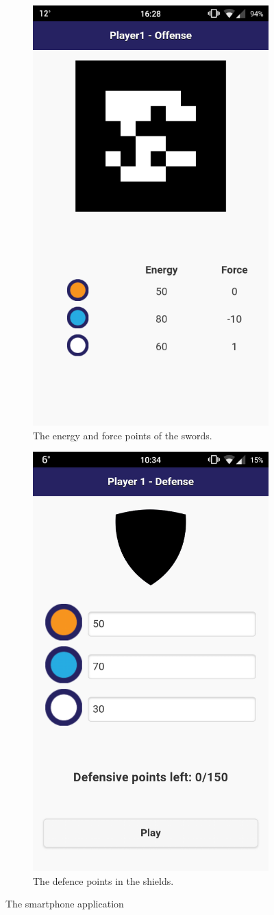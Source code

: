 \begin{figure}[ht!]
  \begin{subfigure}[t]{0.48\linewidth}
    \centering
    \includegraphics[width=0.60\linewidth]{images/c5/points.png} 
    \caption{The energy and force points of the swords.}\label{fig:5a}
  \end{subfigure}\hfill
  \begin{subfigure}[t]{0.48\linewidth}
    \centering
    \includegraphics[width=0.60\linewidth]{images/c5/defense.png} 
    \caption{The defence points in the shields.}\label{fig:5b}
  \end{subfigure}
  \caption{The smartphone application}
\end{figure}

